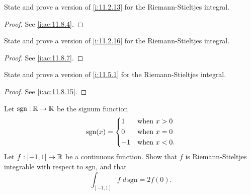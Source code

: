 \begin{ex}\label{i:ex:11.8.2}
  State and prove a version of \cref{i:11.2.13} for the Riemann-Stieltjes integral.
\end{ex}

\begin{proof}
  See \cref{i:ac:11.8.4}.
\end{proof}

\begin{ex}\label{i:ex:11.8.3}
  State and prove a version of \cref{i:11.2.16} for the Riemann-Stieltjes integral.
\end{ex}

\begin{proof}
  See \cref{i:ac:11.8.7}.
\end{proof}

\begin{ex}\label{i:ex:11.8.4}
  State and prove a version of \cref{i:11.5.1} for the Riemann-Stieltjes integral.
\end{ex}

\begin{proof}
  See \cref{i:ac:11.8.15}.
\end{proof}

\begin{ex}\label{i:ex:11.8.5}
  Let \(\text{sgn} : \mathbb{R} \to \mathbb{R}\) be the signum function
  \[
    \text{sgn}(x) = \begin{dcases}
      1  & \text{when } x > 0  \\
      0  & \text{when } x = 0  \\
      -1 & \text{when } x < 0.
    \end{dcases}
  \]
  Let \(f : [-1, 1] \to \mathbb{R}\) be a continuous function.
  Show that \(f\) is Riemann-Stieltjes integrable with respect to \(\text{sgn}\), and that
  \[
    \int_{[-1, 1]} f \; d \, \text{sgn} = 2f(0).
  \]
\end{ex}


